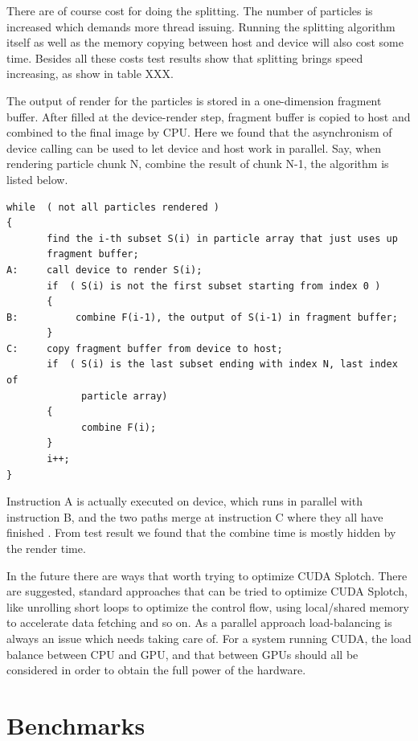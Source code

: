 There are of course cost for doing the splitting. The number of particles is 
increased which demands more thread issuing. Running the splitting algorithm itself
as well as the memory copying between host and device will also cost some time. 
Besides all these costs test results show that splitting brings speed increasing, as show in table XXX.

The output of render for the particles is stored in a one-dimension fragment buffer. 
After filled at the device-render step, fragment buffer is copied to host
 and combined to the final image by CPU. Here we found that the asynchronism of 
 device calling can be used to let device and host work in parallel. Say, when
rendering particle chunk N, combine the result of chunk N-1, the algorithm is listed below.

\begin{verbatim}
while  ( not all particles rendered )
{
       find the i-th subset S(i) in particle array that just uses up 
       fragment buffer;
A:     call device to render S(i);
       if  ( S(i) is not the first subset starting from index 0 )
       { 
B:          combine F(i-1), the output of S(i-1) in fragment buffer;
       }
C:     copy fragment buffer from device to host;
       if  ( S(i) is the last subset ending with index N, last index of
             particle array)
       {
             combine F(i);
       }
       i++;
}
\end{verbatim}


Instruction A is actually executed on device, which runs in parallel with 
instruction B, and the two paths merge at instruction C where they all have finished
. From test result we found that the combine time is mostly hidden by the render time.

In the future there are ways that worth trying to optimize CUDA Splotch. There are suggested, standard approaches
that can be tried to optimize CUDA Splotch, like unrolling short loops to optimize the control flow, using 
local/shared memory to accelerate data fetching and so on. As a parallel approach load-balancing is always an issue
which needs taking care of. For a system running CUDA, the load balance between CPU and GPU, and that between GPUs
should all be considered in order to obtain the full power of the hardware.



\section{Benchmarks}

